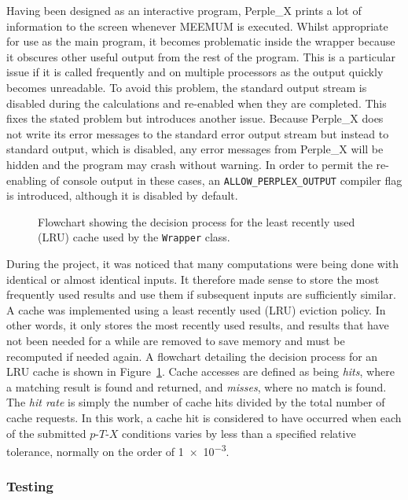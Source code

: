 Having been designed as an interactive program, Perple\_X prints a lot of information to the screen whenever MEEMUM is executed.
Whilst appropriate for use as the main program, it becomes problematic inside the wrapper because it obscures other useful output from the rest of the program.
This is a particular issue if it is called frequently and on multiple processors as the output quickly becomes unreadable.
To avoid this problem, the standard output stream is disabled during the calculations and re-enabled when they are completed.
This fixes the stated problem but introduces another issue. 
Because Perple\_X does not write its error messages to the standard error output stream but instead to standard output, which is disabled, any error messages from Perple\_X will be hidden and the program may crash without \mbox{warning}.
In order to permit the re-enabling of console output in these cases, an \texttt{ALLOW\_PERPLEX\_OUTPUT} compiler flag is introduced, although it is disabled by default.

\begin{figure}[htb]
    \centering
    
    \caption{Flowchart showing the decision process for the least recently used (LRU) cache used by the \texttt{Wrapper} class.}
    \label{fig:cache_flowchart}
\end{figure}

During the project, it was noticed that many computations were being done with identical or almost identical inputs. 
It therefore made sense to store the most frequently used results and use them if \mbox{subsequent} inputs are sufficiently similar.
A cache was implemented using a least recently used (LRU) eviction policy.
In other words, it only stores the most recently used results, and results that have not been needed for a while are removed to save memory and must be recomputed if needed again.
A flowchart detailing the decision process for an LRU cache is shown in Figure~\ref{fig:cache_flowchart}.
Cache accesses are defined as being \textit{hits}, where a matching result is found and returned, and \textit{misses}, where no match is found.
The \textit{hit rate} is simply the number of cache hits divided by the total number of cache requests.
In this work, a cache hit is considered to have occurred when each of the submitted $p$-$T$-$X$ conditions varies by less than a specified relative tolerance, normally on the order of \num{1e-3}.

\subsubsection{Testing}

